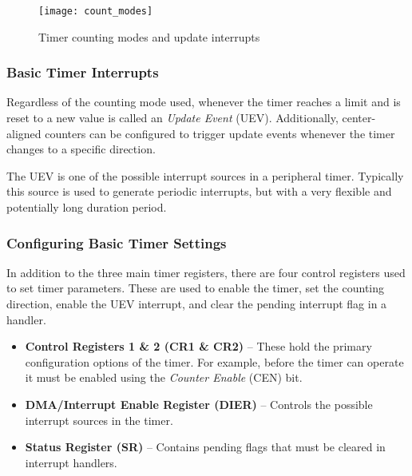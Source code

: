 \documentclass[openany,11pt,fleqn]{book} %
\begin{document}
    \begin{figure}[]
        \centering\texttt{[image: count\_modes]}
        \caption{Timer counting modes and update interrupts}
        \label{count_modes}
    \end{figure}

    \subsubsection{Basic Timer Interrupts}
    
    Regardless of the counting mode used, whenever the timer reaches a limit and is reset to a new value is called an \textit{Update Event} (UEV). Additionally, center-aligned counters can be configured to trigger update events whenever the timer changes to a specific direction. 
    
    The UEV is one of the possible interrupt sources in a peripheral timer. Typically this source is used to generate periodic interrupts, but with a very flexible and potentially long duration period.
    
    \subsubsection{Configuring Basic Timer Settings}
    In addition to the three main timer registers, there are four control registers used to set timer parameters. These are used to enable the timer, set the counting direction, enable the UEV interrupt, and clear the pending interrupt flag in a handler. 
    
    \begin{itemize}
        \item \textbf{Control Registers 1 \& 2 (CR1 \& CR2)} -- These hold the primary configuration options of the timer. For example, before the timer can operate it must be enabled using the \textit{Counter Enable} (CEN) bit. 
        \item\textbf{DMA/Interrupt Enable Register (DIER)} -- Controls the possible interrupt sources in the timer.
        \item\textbf{Status Register (SR)} -- Contains pending flags that must be cleared in interrupt handlers.
    \end{itemize}
\end{document}
